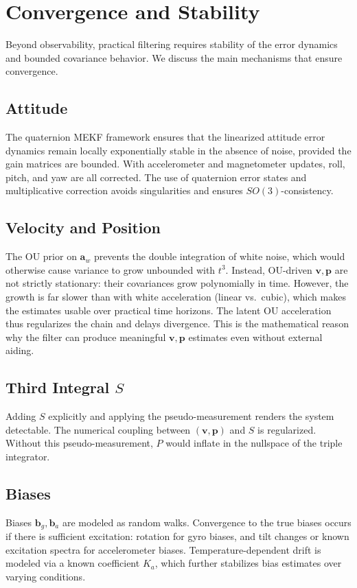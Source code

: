 \documentclass[10pt]{extarticle}
\begin{document}
\section{Convergence and Stability}
\label{sec:convergence}

Beyond observability, practical filtering requires stability of the error dynamics and
bounded covariance behavior. We discuss the main mechanisms that ensure convergence.

\subsection{Attitude}
The quaternion MEKF framework ensures that the linearized attitude error dynamics remain
locally exponentially stable in the absence of noise, provided the gain matrices are bounded.
With accelerometer and magnetometer updates, roll, pitch, and yaw are all corrected. The use
of quaternion error states and multiplicative correction avoids singularities and ensures
$SO(3)$-consistency.

\subsection{Velocity and Position}
The OU prior on $\bm a_w$ prevents the double integration of white noise, which would otherwise
cause variance to grow unbounded with $t^3$. Instead, OU-driven $\bm v,\bm p$ are not strictly stationary: their covariances grow polynomially in time. However, the growth is far slower than with white acceleration (linear vs.\ cubic), which makes the estimates usable over practical time horizons. The latent OU acceleration thus regularizes the chain and delays divergence. This is the mathematical reason
why the filter can produce meaningful $\bm v,\bm p$ estimates even without external aiding.

\subsection{Third Integral $S$}
Adding $S$ explicitly and applying the pseudo-measurement renders the system detectable. The
numerical coupling between $(\bm v,\bm p)$ and $S$ is regularized. Without this pseudo-measurement, 
$P$ would inflate in the nullspace of the triple integrator.

\subsection{Biases}
Biases $\bm b_g,\bm b_a$ are modeled as random walks. Convergence to
the true biases occurs if there is sufficient excitation: rotation for gyro biases, and tilt
changes or known excitation spectra for accelerometer biases. Temperature-dependent drift is
modeled via a known coefficient $K_a$, which further stabilizes bias estimates over varying
conditions.
\end{document}
